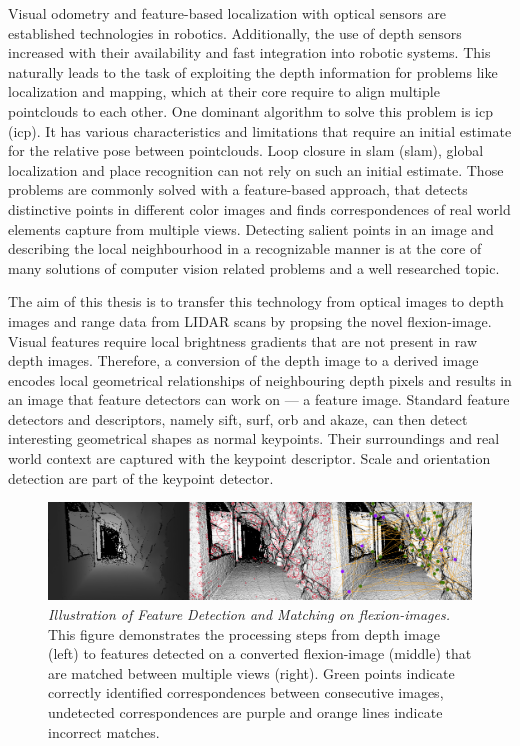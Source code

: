 Visual odometry\cite{he_tvc2019} and \gls{feature}-based localization with optical sensors\cite{sattler_cvpr2018} are established technologies in robotics.
Additionally, the use of depth sensors increased with their availability and fast integration into robotic systems.
This naturally leads to the task of exploiting the depth information for problems like localization and mapping, which at their core require to align multiple pointclouds to each other.
One dominant algorithm to solve this problem is \acrshort{icp} (\acrlong{icp})\cite{besl_pami1992}.
It has various characteristics and limitations that require an initial estimate for the relative pose between pointclouds\cite{rusinkiewicz_ieee2001}.
Loop closure in \acrshort{slam} (\acrlong{slam})\cite{ho_ros2006}, global localization and place recognition\cite{sattler_2011} can not rely on such an initial estimate.
Those problems are commonly solved with a \gls{feature}-based approach, that detects distinctive points in different color images and finds correspondences of real world elements capture from multiple views.
Detecting salient points in an image and describing the local neighbourhood in a recognizable manner is at the core of many solutions of computer vision related problems and a well researched topic\cite{andersson_2016}.

The aim of this thesis is to transfer this technology from optical images to depth images and range data from \acrshort{LIDAR} scans by propsing the novel \Gls{flexion-image}.
Visual features require local brightness gradients that are not present in raw depth images.
Therefore, a conversion of the depth image to a derived image encodes local geometrical relationships of neighbouring depth pixels and results in an image that feature detectors can work on --- a feature image.
Standard feature detectors and descriptors, namely \acrshort{sift}, \acrshort{surf}, \acrshort{orb} and \acrshort{akaze}, can then detect interesting geometrical shapes as normal keypoints.
Their surroundings and real world context are captured with the keypoint descriptor.
Scale and orientation detection are part of the keypoint detector.
\begin{figure}[htb]
    \includegraphics[width=\linewidth]{chapter01/masterarbeit_method.png}
    \caption[Illustration of Feature Detection and Matching on \Glspl{flexion-image}]{\emph{Illustration of Feature Detection and Matching on \Glspl{flexion-image}.} This figure demonstrates the processing steps from depth image (left) to features detected on a converted \gls{flexion-image} (middle) that are matched between multiple views (right). Green points indicate correctly identified correspondences between consecutive images, undetected correspondences are purple and orange lines indicate incorrect matches.}\label{fig:method_example}
\end{figure}

